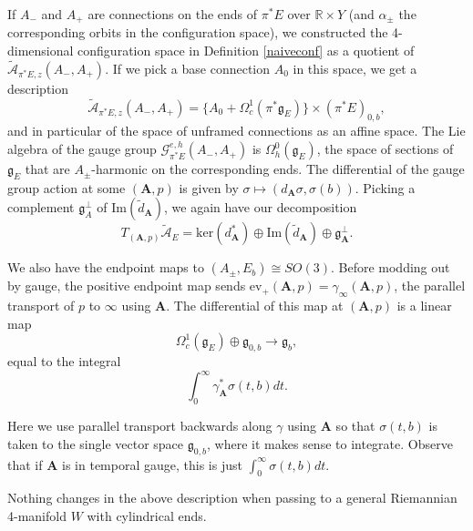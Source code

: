 \documentclass{memo-l}
\newcommand{\pE}{\pi^* \! E}
\theoremstyle{definition}
\theoremstyle{remark}
\numberwithin{section}{chapter}
\numberwithin{equation}{chapter}
\begin{document}
If $A_-$ and $A_+$ are connections on the ends of $\pE$ over $\mathbb R \times Y$ (and $\alpha_\pm$ the corresponding orbits in the configuration space), we constructed the 4-dimensional configuration space in Definition \ref{naiveconf} as a quotient of $\widetilde{\mathcal A}_{\pE,z}(A_-, A_+)$. If we pick a base connection $A_0$ in this space, we get a description 
$$\widetilde{\mathcal A}_{\pE,z}(A_-, A_+) = \{A_0 + \Omega^1_c(\pi^*\mathfrak g_E)\} \times (\pE)_{0,b},$$
and in particular of the space of unframed connections as an affine space. The Lie algebra of the gauge group $\mathcal G^{e,h}_{\pE}(A_-, A_+)$ is $\Omega^0_h(\mathfrak g_E)$, the space of sections of $\mathfrak g_E$ that are $A_\pm$-harmonic on the corresponding ends. The differential of the gauge group action at some $(\mathbf{A}, p)$ is given by $\sigma \mapsto (d_{\mathbf{A}} \sigma, \sigma(b)).$ Picking a complement $\mathfrak g_A^\perp$ of $\text{Im}(\tilde d_{\mathbf{A}})$, we again have our decomposition 
$$T_{(\mathbf{A},p)} \widetilde{\mathcal A}_E = \text{ker}(d_{\mathbf A}^*) \oplus \text{Im}(\tilde d_{\mathbf A}) \oplus \mathfrak g_{\mathbf A}^\perp.$$ 

We also have the endpoint maps to $(A_\pm, E_b) \cong SO(3)$. Before modding out by gauge, the positive endpoint map sends $\text{ev}_+(\mathbf{A},p) = \gamma_\infty(\mathbf{A},p)$, the parallel transport of $p$ to $\infty$ using $\mathbf{A}$. The differential of this map at $(\mathbf{A},p)$ is a linear map 
$$\Omega^1_c(\mathfrak g_E) \oplus \mathfrak g_{0,b} \to \mathfrak g_b,$$ 
equal to the integral 
$$\int_0^\infty \gamma^*_{\mathbf A}\sigma(t,b)dt.$$ 

Here we use parallel transport backwards along $\gamma$ using $\mathbf{A}$ so that $\sigma(t,b)$ is taken to the single vector space $\mathfrak g_{0,b}$, where it makes sense to integrate. Observe that if $\mathbf{A}$ is in temporal gauge, this is just $\int_0^\infty \sigma(t,b)dt$.

Nothing changes in the above description when passing to a general Riemannian 4-manifold $W$ with cylindrical ends. 
\end{document}
